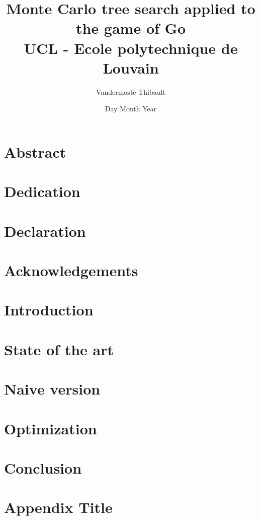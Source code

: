 \documentclass[12pt]{report}
\title{
	{Monte Carlo tree search applied to the game of Go}\\
	{\large UCL - Ecole polytechnique de Louvain}\\
}
\author{Vandermoste Thibault}
\date{Day Month Year}
\begin{document}
\maketitle


\chapter*{Abstract}

\chapter*{Dedication}

\chapter*{Declaration}

\chapter*{Acknowledgements}

\tableofcontents

\chapter{Introduction}


\chapter{State of the art}


\chapter{Naive version}


\chapter{Optimization}



\chapter{Conclusion}
%

\appendix
\chapter{Appendix Title}
%
\end{document}
